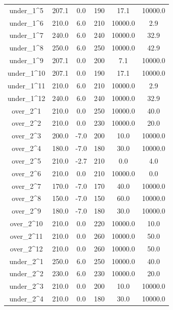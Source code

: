 \documentclass[a4paper,11pt]{article}
\begin{document}
\begin{longtable}{cccccc}
under\_1\textasciicircum{}5 & 207.1 & 0.0 & 190 & 17.1 & 10000.0\\
\addlinespace
under\_1\textasciicircum{}6 & 210.0 & 6.0 & 210 & 10000.0 & 2.9\\
under\_1\textasciicircum{}7 & 240.0 & 6.0 & 240 & 10000.0 & 32.9\\
under\_1\textasciicircum{}8 & 250.0 & 6.0 & 250 & 10000.0 & 42.9\\
under\_1\textasciicircum{}9 & 207.1 & 0.0 & 200 & 7.1 & 10000.0\\
under\_1\textasciicircum{}10 & 207.1 & 0.0 & 190 & 17.1 & 10000.0\\
\addlinespace
under\_1\textasciicircum{}11 & 210.0 & 6.0 & 210 & 10000.0 & 2.9\\
under\_1\textasciicircum{}12 & 240.0 & 6.0 & 240 & 10000.0 & 32.9\\
over\_2\textasciicircum{}1 & 210.0 & 0.0 & 250 & 10000.0 & 40.0\\
over\_2\textasciicircum{}2 & 210.0 & 0.0 & 230 & 10000.0 & 20.0\\
over\_2\textasciicircum{}3 & 200.0 & -7.0 & 200 & 10.0 & 10000.0\\
\addlinespace
over\_2\textasciicircum{}4 & 180.0 & -7.0 & 180 & 30.0 & 10000.0\\
over\_2\textasciicircum{}5 & 210.0 & -2.7 & 210 & 0.0 & 4.0\\
over\_2\textasciicircum{}6 & 210.0 & 0.0 & 210 & 10000.0 & 0.0\\
over\_2\textasciicircum{}7 & 170.0 & -7.0 & 170 & 40.0 & 10000.0\\
over\_2\textasciicircum{}8 & 150.0 & -7.0 & 150 & 60.0 & 10000.0\\
\addlinespace
over\_2\textasciicircum{}9 & 180.0 & -7.0 & 180 & 30.0 & 10000.0\\
over\_2\textasciicircum{}10 & 210.0 & 0.0 & 220 & 10000.0 & 10.0\\
over\_2\textasciicircum{}11 & 210.0 & 0.0 & 260 & 10000.0 & 50.0\\
over\_2\textasciicircum{}12 & 210.0 & 0.0 & 260 & 10000.0 & 50.0\\
under\_2\textasciicircum{}1 & 250.0 & 6.0 & 250 & 10000.0 & 40.0\\
\addlinespace
under\_2\textasciicircum{}2 & 230.0 & 6.0 & 230 & 10000.0 & 20.0\\
under\_2\textasciicircum{}3 & 210.0 & 0.0 & 200 & 10.0 & 10000.0\\
under\_2\textasciicircum{}4 & 210.0 & 0.0 & 180 & 30.0 & 10000.0\\

\end{longtable}
\end{document}
